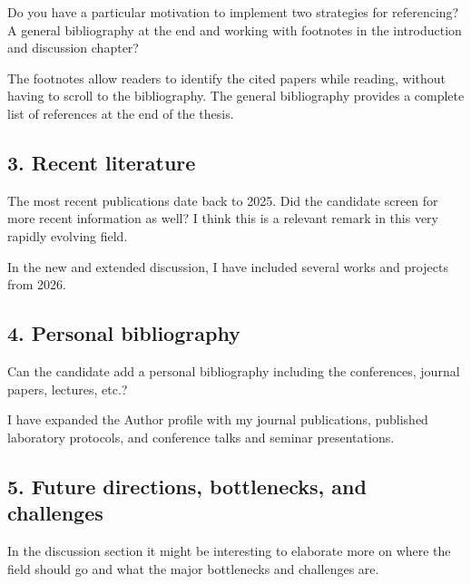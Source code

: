 \documentclass[11pt,a4paper]{article}
\begin{document}
\begin{reviewcomment}
Do you have a particular motivation to implement two strategies for referencing? A general bibliography at the end and working with footnotes in the introduction and discussion chapter?
\end{reviewcomment}

The footnotes allow readers to identify the cited papers while reading, without having to scroll to the bibliography. The general bibliography provides a complete list of references at the end of the thesis.

\subsection*{\sffamily\color{heading}3. Recent literature}

\begin{reviewcomment}
The most recent publications date back to 2025. Did the candidate screen for more recent information as well? I think this is a relevant remark in this very rapidly evolving field.
\end{reviewcomment}

In the new and extended discussion, I have included several works and projects from 2026.

\subsection*{\sffamily\color{heading}4. Personal bibliography}

\begin{reviewcomment}
Can the candidate add a personal bibliography including the conferences, journal papers, lectures, etc.?
\end{reviewcomment}

I have expanded the Author profile with my journal publications, published laboratory protocols, and conference talks and seminar presentations.

\subsection*{\sffamily\color{heading}5. Future directions, bottlenecks, and challenges}

\begin{reviewcomment}
In the discussion section it might be interesting to elaborate more on where the field should go and what the major bottlenecks and challenges are.
\end{reviewcomment}
\end{document}
